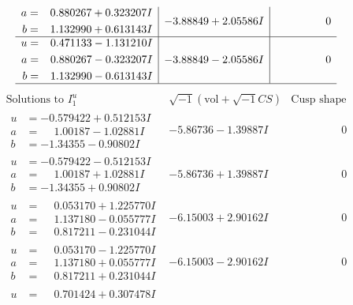 \documentclass[1p]{elsarticle_modified}
\theoremstyle{definition}
\newcommand{\I}{\sqrt{-1}}
\begin{document}
$$\begin{array}{c|c|c}
\begin{aligned}
a &= \phantom{-}0.880267 + 0.323207 I \\
b &= \phantom{-}1.132990 + 0.613143 I\end{aligned}
 & -3.88849 + 2.05586 I & \phantom{-0.000000 } 0 \\ \hline\begin{aligned}
u &= \phantom{-}0.471133 - 1.131210 I \\
a &= \phantom{-}0.880267 - 0.323207 I \\
b &= \phantom{-}1.132990 - 0.613143 I\end{aligned}
 & -3.88849 - 2.05586 I & \phantom{-0.000000 } 0\\
 \hline 
 \end{array}$$\newpage$$\begin{array}{c|c|c}  
\text{Solutions to }I^u_{1}& \I (\text{vol} + \sqrt{-1}CS) & \text{Cusp shape}\\
 \hline 
\begin{aligned}
u &= -0.579422 + 0.512153 I \\
a &= \phantom{-}1.00187 - 1.02881 I \\
b &= -1.34355 - 0.90802 I\end{aligned}
 & -5.86736 - 1.39887 I & \phantom{-0.000000 } 0 \\ \hline\begin{aligned}
u &= -0.579422 - 0.512153 I \\
a &= \phantom{-}1.00187 + 1.02881 I \\
b &= -1.34355 + 0.90802 I\end{aligned}
 & -5.86736 + 1.39887 I & \phantom{-0.000000 } 0 \\ \hline\begin{aligned}
u &= \phantom{-}0.053170 + 1.225770 I \\
a &= \phantom{-}1.137180 - 0.055777 I \\
b &= \phantom{-}0.817211 - 0.231044 I\end{aligned}
 & -6.15003 + 2.90162 I & \phantom{-0.000000 } 0 \\ \hline\begin{aligned}
u &= \phantom{-}0.053170 - 1.225770 I \\
a &= \phantom{-}1.137180 + 0.055777 I \\
b &= \phantom{-}0.817211 + 0.231044 I\end{aligned}
 & -6.15003 - 2.90162 I & \phantom{-0.000000 } 0 \\ \hline\begin{aligned}
u &= \phantom{-}0.701424 + 0.307478 I \\

\end{aligned}
\end{array}$$
\end{document}
